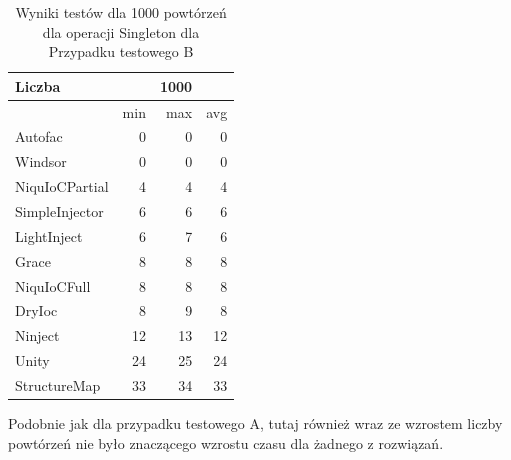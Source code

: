 \documentclass[12pt]{article}
\begin{document}
\begin{table}[H]
\captionsetup{belowskip=0pt,aboveskip=0pt}
\begin{center}
\begin{small}
	\begin{tabular}{ | l | r r r | }
    		\hline
Liczba & & 1000 & \\ \hline
 & min & max & avg \\ \hline
Autofac & 0 & 0 & 0 \\ \hline
Windsor & 0 & 0 & 0 \\ \hline
NiquIoCPartial & 4 & 4 & 4 \\ \hline
SimpleInjector & 6 & 6 & 6 \\ \hline
LightInject & 6 & 7 & 6 \\ \hline
Grace & 8 & 8 & 8 \\ \hline
NiquIoCFull & 8 & 8 & 8 \\ \hline
DryIoc & 8 & 9 & 8 \\ \hline
Ninject & 12 & 13 & 12 \\ \hline
Unity & 24 & 25 & 24 \\ \hline
StructureMap & 33 & 34 & 33 \\ \hline
  	\end{tabular}
\end{small}
\end{center}
\caption{Wyniki testów dla 1000 powtórzeń dla operacji Singleton dla Przypadku testowego B}
\label{TestCaseB_Singleton1000}
\end{table}
Podobnie jak dla przypadku testowego A, tutaj również wraz ze wzrostem liczby powtórzeń nie było znaczącego wzrostu czasu dla żadnego z rozwiązań.
\end{document}
